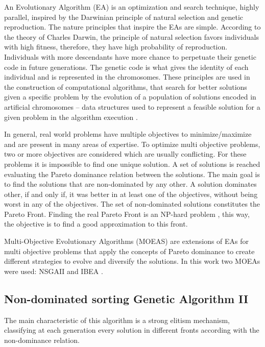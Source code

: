 An Evolutionary Algorithm (EA) is an optimization and search technique, highly parallel, inspired by the Darwinian principle of natural selection and genetic reproduction. The nature principles that inspire the EAs are simple. According to the theory of Charles Darwin, the principle of natural selection favors individuals with high fitness, therefore, they have high probability of reproduction. Individuals with more descendants have more chance to perpetuate their genetic code in future generations. The genetic code is what gives the identity of each individual and is represented in the chromosomes. These principles are used in the construction of computational algorithms, that search for better solutions given a specific problem by the evolution of a population of solutions encoded in artificial chromosomes -- data structures used to represent a feasible solution for a given problem in the algorithm execution \cite{pacheco1999algoritmos}.


In general, real world problems have multiple objectives to minimize/maximize and are present in many areas of expertise. To optimize multi objective problems, two or more objectives are considered which are usually conflicting. For these problems it is impossible to find one unique solution. A set of solutions is reached evaluating the Pareto dominance relation \cite{pareto} between the solutions. The main goal is to find the solutions that are non-dominated by any other. A solution dominates other, if and only if, it was better in at least one of the objectives, without being worst in any of the objectives. The set of non-dominated solutions constitutes the Pareto Front. Finding the real Pareto Front is an NP-hard problem \cite{fonseca2005tutorial}, this way, the objective is to find a good approximation to this front.


Multi-Objective Evolutionary Algorithms (MOEAS) are extensions of EAs for multi objective problems that apply the concepts of Pareto dominance to create different strategies to evolve and diversify the solutions. In this work two MOEAs were used: NSGAII \cite{deb2002fast} and IBEA \cite{zitzler2004indicator}.


\subsection{Non-dominated sorting Genetic Algorithm II}


The main characteristic of this algorithm is a strong elitism mechanism, classifying at each generation every solution in different fronts according with the non-dominance relation.


